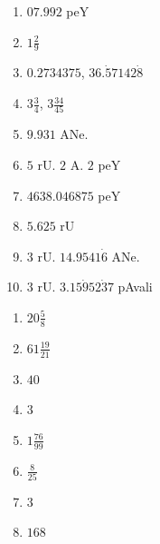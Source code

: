 
\begin{multicols}{2}
\begin{enumerate}[$(1)$]
\item $07.992$ peY
\item $1\frac{2}{9}$
\item $0.2734375$, $36.\dot{5}7142\dot{8}$
\item $3 \frac{3}{4}$, $3 \frac{34}{45}$
\item $9.931$ ANe.
\item $5$ rU. $2$ A. $2$ peY
\item $4638.046875$ peY
\item $5.625$ rU
\item $3$ rU. $14.9541\dot{6}$ ANe.
\item $3$ rU. $3.15\dot{9}52\dot{3}7$ pAvali
\end{enumerate}
\end{multicols}


\begin{multicols}{4}
\begin{enumerate}[$(1)$]
\item $20\frac{5}{8}$
\item $61 \frac{19}{21}$
\item $40$
\item $3$
\item $1\frac{76}{99}$
\item $\frac{8}{25}$
\item $3$
\item $168$ 
\end{enumerate}
\end{multicols}


